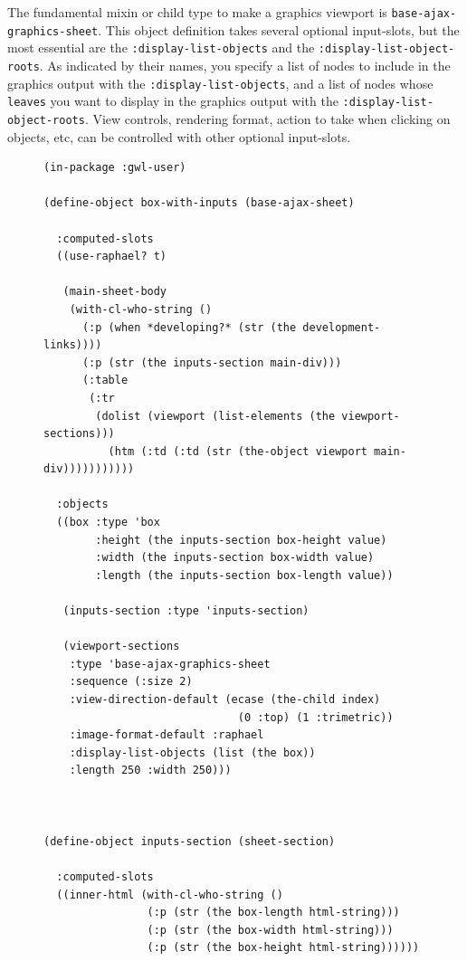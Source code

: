 \documentclass [11pt]{book}
\begin{document}
\label{subsec:includinggraphics}



The fundamental mixin or child type to make a graphics viewport is \texttt{base-ajax-graphics-sheet}. This object definition takes several optional input-slots, but the most essential are the \texttt{:display-list-objects} and the \texttt{:display-list-object-roots}. As indicated by their names, you specify a list of nodes to include in
the graphics output with the \texttt{:display-list-objects}, and a list of nodes whose \texttt{leaves} you want to display in the graphics output with the \texttt{:display-list-object-roots}. View controls, rendering format, action to take when clicking on objects, etc, 
can be controlled with other optional input-slots.


\begin{figure}
\begin{lrbox}{\boxedverb}
\begin{minipage}{\linewidth}
{\small

\begin{verbatim}(in-package :gwl-user)

(define-object box-with-inputs (base-ajax-sheet)
  
  :computed-slots
  ((use-raphael? t)
   
   (main-sheet-body 
    (with-cl-who-string ()
      (:p (when *developing?* (str (the development-links))))
      (:p (str (the inputs-section main-div)))
      (:table
       (:tr
        (dolist (viewport (list-elements (the viewport-sections)))
          (htm (:td (:td (str (the-object viewport main-div)))))))))))
  
  :objects
  ((box :type 'box
        :height (the inputs-section box-height value)
        :width (the inputs-section box-width value)
        :length (the inputs-section box-length value))
   
   (inputs-section :type 'inputs-section)

   (viewport-sections
    :type 'base-ajax-graphics-sheet
    :sequence (:size 2)
    :view-direction-default (ecase (the-child index)
                              (0 :top) (1 :trimetric))
    :image-format-default :raphael
    :display-list-objects (list (the box))
    :length 250 :width 250)))
  

 
(define-object inputs-section (sheet-section)
  
  :computed-slots
  ((inner-html (with-cl-who-string ()
                (:p (str (the box-length html-string)))
                (:p (str (the box-width html-string)))
                (:p (str (the box-height html-string))))))


\end{verbatim}}
\end{minipage}
\end{lrbox}
\end{figure}
\end{document}
